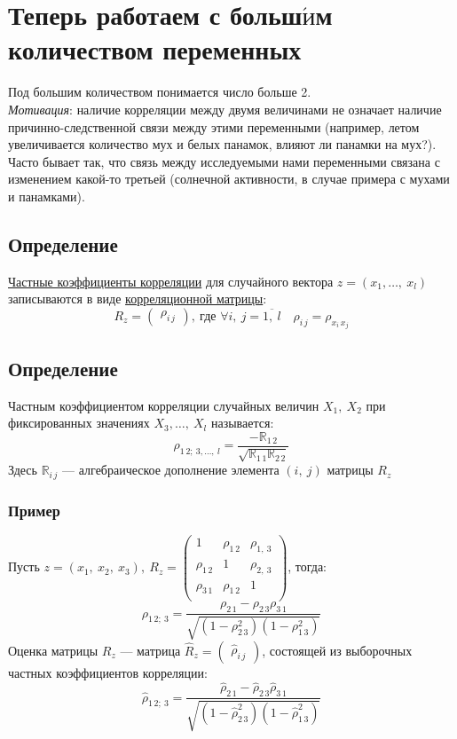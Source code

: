 \documentclass[12pt, a4paper]{article}
\begin{document}
\section*{Теперь работаем с больш$\acute{\textbf{и}}$м количеством переменных}
Под большим количеством понимается число больше 2.\\
\textit{Мотивация}: наличие корреляции между двумя величинами не означает наличие причинно-следственной связи между этими переменными (например, летом увеличивается количество мух и белых панамок, влияют ли панамки на мух?). Часто бывает так, что связь между исследуемыми нами переменными связана с изменением какой-то третьей (солнечной активности, в случае примера с мухами и панамками).
\subsection*{Определение}
\underline{Частные коэффициенты корреляции} для случайного вектора $z = (x_1,\dots,\ x_l)$ записываются в виде \underline{корреляционной матрицы}:
\[
R_z = \begin{pmatrix}
    \rho_{i\, j}
\end{pmatrix},\ \text{где } \forall i,\ j = \overline{1,\ l}\quad \rho_{i\, j} = \rho_{x_i\, x_j}
\]
\subsection*{Определение}
Частным коэффициентом корреляции случайных величин $X_1,\ X_2$ при фиксированных значениях $X_3,\dots,\ X_l$ называется:
\[
\rho_{1\, 2;\ 3,\dots,\ l} = \frac{-\mathbb{R}_{1\, 2}}{\sqrt{\mathbb{R}_{1\, 1}\mathbb{R}_{2\, 2} }}
\]
Здесь $\mathbb{R}_{i\, j}$ --- алгебраическое дополнение элемента $(i,\ j)$ матрицы $R_z$\\
\subsubsection*{Пример}
Пусть $z = (x_1,\ x_2,\ x_3),\ R_z = \begin{pmatrix}
    1 & \rho_{1\, 2} & \rho_{1,\ 3}\\
    \rho_{1\, 2} & 1 & \rho_{2,\ 3}\\
    \rho_{3\, 1} & \rho_{1\, 2} & 1\\
\end{pmatrix}$, тогда:
\[
\rho_{1\, 2;\ 3} = \frac{\rho_{2\, 1} - \rho_{2\, 3}\rho_{3\, 1}}{\sqrt{ (1 - \rho_{2\, 3}^2) (1 - \rho_{1\, 3}^2) }}
\]
Оценка матрицы $R_z$ --- матрица $\hat R_z = \begin{pmatrix}
    \hat \rho_{i\, j}
\end{pmatrix}$, состоящей из выборочных частных коэффициентов корреляции:
\[
\hat \rho_{1\, 2;\ 3} = \frac{\hat \rho_{2\, 1} - \hat\rho_{2\, 3} \hat\rho_{3\, 1}}{\sqrt{ (1 - \hat\rho_{2\, 3}^2) (1 - \hat\rho_{1\, 3}^2) }}
\]
\end{document}
